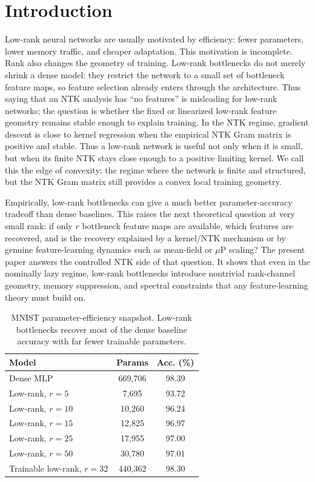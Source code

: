 \documentclass{article}
\begin{document}
\section{Introduction}
Low-rank neural networks are usually motivated by efficiency: fewer parameters, lower memory traffic, and cheaper adaptation. This motivation is incomplete. Rank also changes the geometry of training. Low-rank bottlenecks do not merely shrink a dense model: they restrict the network to a small set of bottleneck feature maps, so feature selection already enters through the architecture. Thus saying that an NTK analysis has ``no features'' is misleading for low-rank networks; the question is whether the fixed or linearized low-rank feature geometry remains stable enough to explain training. In the NTK regime, gradient descent is close to kernel regression when the empirical NTK Gram matrix is positive and stable. Thus a low-rank network is useful not only when it is small, but when its finite NTK stays close enough to a positive limiting kernel. We call this the edge of convexity: the regime where the network is finite and structured, but the NTK Gram matrix still provides a convex local training geometry.

Empirically, low-rank bottlenecks can give a much better parameter-accuracy tradeoff than dense baselines. This raises the next theoretical question at very small rank: if only \(r\) bottleneck feature maps are available, which features are recovered, and is the recovery explained by a kernel/NTK mechanism or by genuine feature-learning dynamics such as mean-field or \(\mu\)P scaling? The present paper answers the controlled NTK side of that question. It shows that even in the nominally lazy regime, low-rank bottlenecks introduce nontrivial rank-channel geometry, memory suppression, and spectral constraints that any feature-learning theory must build on.

\begin{table}[t]
\centering
\caption{MNIST parameter-efficiency snapshot. Low-rank bottlenecks recover most of the dense baseline accuracy with far fewer trainable parameters.}
\label{tab:intro-mnist-lowrank}
\scriptsize
\begin{tabular}{lcc}
\toprule
Model & Params & Acc. (\%) \\
\midrule
Dense MLP & 669,706 & 98.39 \\
Low-rank, \(r=5\) & 7,695 & 93.72 \\
Low-rank, \(r=10\) & 10,260 & 96.24 \\
Low-rank, \(r=15\) & 12,825 & 96.97 \\
Low-rank, \(r=25\) & 17,955 & 97.00 \\
Low-rank, \(r=50\) & 30,780 & 97.01 \\
Trainable low-rank, \(r=32\) & 440,362 & 98.30 \\
\bottomrule
\end{tabular}
\end{table}
\end{document}

